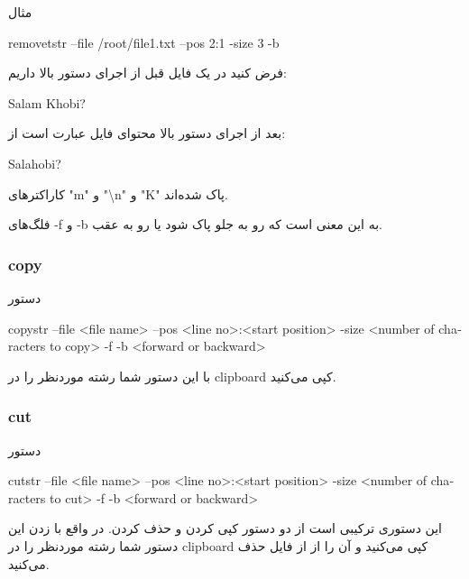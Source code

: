 \documentclass[]{article}
\begin{document}
\begin{mybox}[colback=yellow]{مثال}
	\begin{latin}	
		removetstr --file /root/file1.txt --pos 2:1 -size 3 -b
	\end{latin}
\end{mybox}

فرض کنید در یک فایل قبل از اجرای دستور بالا داریم:

\begin{latin}
{\mymono
Salam
Khobi?}
\end{latin}

بعد از اجرای دستور بالا محتوای فایل عبارت است از:

\begin{latin}
{\mymono
Salahobi?}
\end{latin}

کاراکترهای "m" و "\textbackslash n" و "K" پاک شده‌اند.

فلگ‌های -f و -b به این معنی است که رو به جلو پاک شود یا رو به عقب.


\subsubsection*{{\titr copy}}

\begin{mybox}[colback=yellow]{دستور}
	\begin{latin}	
		copystr --file <file name> --pos <line no>:<start position> -size <number of characters to copy> -f -b <forward or backward>
	\end{latin}
\end{mybox}

با این دستور شما رشته موردنظر را در clipboard کپی می‌کنید.

\subsubsection*{{\titr cut}}

\begin{mybox}[colback=yellow]{دستور}
	\begin{latin}	
		cutstr --file <file name> --pos <line no>:<start position> -size <number of characters to cut> -f -b <forward or backward>
	\end{latin}
\end{mybox}

این دستوری ترکیبی است از دو دستور کپی کردن و حذف کردن. در واقع با زدن این دستور شما رشته موردنظر را در clipboard کپی می‌کنید و آن را از از فایل حذف می‌کنید.
\end{document}
